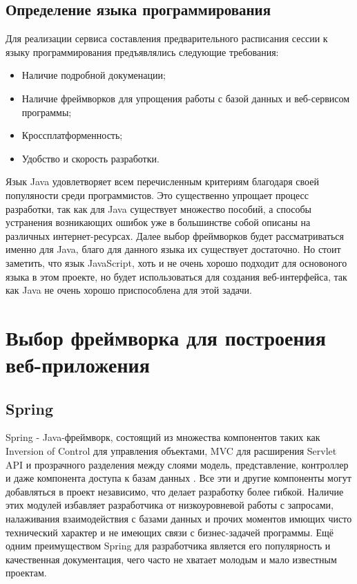 \subsection{Определение языка программирования}
Для реализации сервиса составления предварительного расписания сессии к языку программирования предъявлялись следующие требования:
\begin{itemize}
\item Наличие подробной докуменации;
\item Наличие фреймворков для упрощения работы с базой данных и веб-сервисом программы;
\item Кроссплатформенность;
\item Удобство и скорость разработки.
\end{itemize}

Язык Java удовлетворяет всем перечисленным критериям благодаря своей популяности среди программистов. Это существенно упрощает процесс разработки, так как для Java существует множество пособий, а способы устранения возникающих ошибок уже в большинстве собой описаны на различных интернет-ресурсах. Далее выбор фреймворков будет рассматриваться именно для Java, благо для данного языка их существует достаточно. Но стоит заметить, что язык JavaScript, хоть и не очень хорошо подходит для основоного языка в этом проекте, но будет использоваться для создания веб-интерфейса, так как Java не очень хорошо приспособлена для этой задачи.

\section{Выбор фреймворка для построения веб-приложения} \label{ch3:sec2}
\subsection{Spring}
Spring - Java-фреймворк, состоящий из множества компонентов таких как Inversion of Control для управления объектами, MVC для расширения Servlet API и прозрачного разделения между слоями модель, представление, контроллер и даже компонента доступа к базам данных \cite{spring}. Все эти и другие компоненты могут добавляться в проект независимо, что делает разработку более гибкой. Наличие этих модулей избавляет разработчика от низкоуровневой работы с запросами, налаживания взаимодействия с базами данных и прочих моментов имющих чисто технический характер и не имеющих связи с бизнес-задачей программы. Ещё одним преимуществом Spring  для разработчика является его популярность и качественная документация, чего часто не хватает молодым и мало известным проектам.

